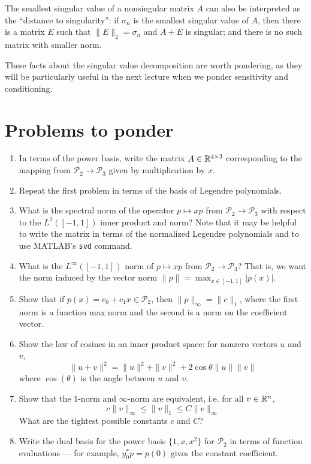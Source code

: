 \documentclass[12pt, leqno]{article}
\begin{document}
The smallest singular value of a nonsingular matrix $A$ can also be
interpreted as the ``distance to singularity'': if $\sigma_n$ is the
smallest singular value of $A$, then there is a matrix $E$ such that
$\|E\|_2 = \sigma_n$ and $A+E$ is singular; and there is no such
matrix with smaller norm.

These facts about the singular value decomposition are worth
pondering, as they will be particularly useful in the next lecture
when we ponder sensitivity and conditioning.

\section{Problems to ponder}

\begin{enumerate}
\item In terms of the power basis, write the matrix
  $A \in \mathbb{R}^{4 \times 3}$ corresponding to the mapping from
  $\mathcal{P}_2 \rightarrow \mathcal{P}_3$ given by multiplication by $x$.
\item Repeat the first problem in terms of the basis of Legendre
  polynomials.
\item What is the spectral norm of the operator $p \mapsto xp$ from
  $\mathcal{P}_2 \rightarrow \mathcal{P}_3$ with respect to the
  $L^2([-1,1])$ inner product and norm? Note that it may be
  helpful to write the matrix in terms of the normalized Legendre
  polynomials and to use MATLAB's {\tt svd} command.
\item What is the $L^{\infty}([-1,1])$ norm of $p \mapsto xp$ from
  $\mathcal{P}_2 \rightarrow \mathcal{P}_3$?  That is, we want
  the norm induced by the vector norm $\|p\| = \max_{x\in[-1,1]} |p(x)|$.
\item Show that if $p(x) = c_0 + c_1 x \in \mathcal{P}_2$, then
  $\|p\|_{\infty} = \|c\|_1$, where the first norm is a function
  max norm and the second is a norm on the coefficient vector.
\item Show the law of cosines in an inner product space:
  for nonzero vectors $u$ and $v$,
  \[
    \|u + v\|^2 = \|u\|^2 + \|v\|^2 + 2 \cos{\theta} \|u\| \|v\|
  \]
  where $\cos(\theta)$ is the angle between $u$ and $v$.
\item Show that the $1$-norm and $\infty$-norm are equivalent,
  i.e. for all $v \in \mathbb{R}^n$,
  \[
    c \|v\|_\infty \leq \|v\|_1 \leq C \|v\|_\infty
  \]
  What are the tightest possible constants $c$ and $C$?
\item Write the dual basis for the power basis $\{1, x, x^2\}$ for
  $\mathcal{P}_2$ in terms of function evaluations --- for example,
  $y_0^* p = p(0)$ gives the constant coefficient.
\end{enumerate}
\end{document}
